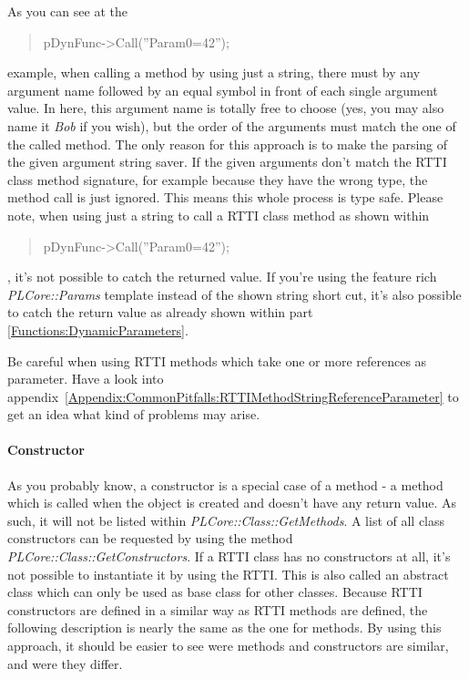 As you can see at the \begin{quote}pDynFunc->Call(''Param0=42'');\end{quote} example, when calling a method by using just a string, there must by any argument name followed by an equal symbol in front of each single argument value. In here, this argument name is totally free to choose (yes, you may also name it \emph{Bob} if you wish), but the order of the arguments must match the one of the called method. The only reason for this approach is to make the parsing of the given argument string saver. If the given arguments don't match the RTTI class method signature, for example because they have the wrong type, the method call is just ignored. This means this whole process is type safe. Please note, when using just a string to call a RTTI class method as shown within \begin{quote}pDynFunc->Call(''Param0=42'');\end{quote}, it's not possible to catch the returned value. If you're using the feature rich \emph{PLCore::Params} template instead of the shown string short cut, it's also possible to catch the return value as already shown within part \ref{Functions:DynamicParameters}.

Be careful when using RTTI methods which take one or more references as parameter. Have a look into appendix~\ref{Appendix:CommonPitfalls:RTTIMethodStringReferenceParameter} to get an idea what kind of problems may arise.


\paragraph{Constructor}
\label{ClassMembers:Constructor}
As you probably know, a constructor is a special case of a method - a method which is called when the object is created and doesn't have any return value. As such, it will not be listed within \emph{PLCore::Class::GetMethods}. A list of all class constructors can be requested by using the method \emph{PLCore::Class::GetConstructors}. If a RTTI class has no constructors at all, it's not possible to instantiate it by using the RTTI. This is also called an abstract class which can only be used as base class for other classes. Because RTTI constructors are defined in a similar way as RTTI methods are defined, the following description is nearly the same as the one for methods. By using this approach, it should be easier to see were methods and constructors are similar, and were they differ.

